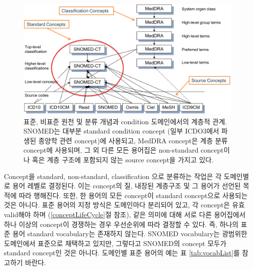 \documentclass[10.5pt]{book}
\theoremstyle{definition}
\theoremstyle{definition}
\theoremstyle{definition}
\theoremstyle{remark}
\begin{document}
\begin{figure}

{\centering \includegraphics[width=1\linewidth]{images/StandardizedVocabularies/hierarchy} 

}

\caption{표준, 비표준 원천 및 분류 개념과 condition 도메인에서의 계층적 관계. SNOMED는 대부분 standard condition concept (일부 ICDO3에서 파생된 종양학 관련 concept)에 사용되고, MedDRA concept은 계층 분류 concept에 사용되며, 그 외 다른 모든 용어집은 non-standard concept이나 혹은 계층 구조에 포함되지 않는 source concept을 가지고 있다.}\label{fig:hierarchy}
\end{figure}

Concept을 standard, non-standard, classification 으로 분류하는 작업은 각
도메인별로 용어 레벨로 결정된다. 이는 concept의 질, 내장된 계층구조 및
그 용어가 선언된 목적에 따라 행해진다. 또한, 한 용어의 모든 concept이
standard concept으로 사용되는 것은 아니다. 표준 용어의 지정 방식은
도메인마다 분리되어 있고, 각 concept은 유효 valid해야 하며
(\ref{conceptLifeCycle}절 참조), 같은 의미에 대해 서로 다른 용어집에서
하나 이상의 concept이 경쟁하는 경우 우선순위에 따라 결정할 수 있다. 즉,
하나의 표준 용어 standard vocabulary는 존재하지 않는다. SNOMED
vocabulary는 광범위한 도메인에서 표준으로 채택하고 있지만, 그렇다고
SNOMED의 concept 모두가 standard concept인 것은 아니다. 도메인별 표준
용어의 예는 표 \ref{tab:vocabList}를 참고하기 바란다.
\end{document}
